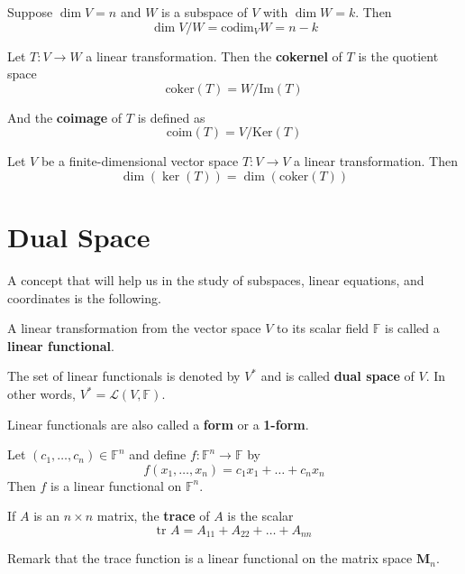 \begin{theorem}
	Suppose $\dim V = n$ and $W$ is a subspace of $V$ with $\dim W = k$. Then 
	\[
		\dim V/W = \text{codim}_V W = n-k
	\]
\end{theorem}

\begin{definition}
	Let $T : V \longrightarrow W$ a linear transformation. Then the \textbf{cokernel} of $T$ is the quotient space
	\[
		\text{coker} (T) = W / \text{Im}(T)
	\] 

	And the \textbf{coimage} of $T$ is defined as
	\[
		\text{coim} (T) = V / \text{Ker}(T)
	\]
\end{definition}

\begin{corollary}
	Let $V$ be a finite-dimensional vector space $T : V \longrightarrow V$ a linear transformation. Then 
	\[
		\dim (\ker (T)) = \dim (\text{coker} (T))
	\]
\end{corollary}

\section{Dual Space}

A concept that will help us in the study of subspaces, linear equations, and coordinates is the following.

\begin{definition}
	A linear transformation from the vector space $V$ to its scalar field $\mathbb{F}$ is called a \textbf{linear functional}.
	
	The set of linear functionals is denoted by $V^\ast$ and is called \textbf{dual space} of $V$. In other words, $V^\ast = \mathcal{L}(V, \mathbb{F})$.
\end{definition}

Linear functionals are also called a \textbf{form} or a \textbf{1-form}.

\begin{example}
	Let $(c_1, \ldots, c_n) \in \mathbb{F}^n$ and define $f : \mathbb{F}^n \longrightarrow \mathbb{F}$ by 
	\[
		f(x_1, \ldots, x_n) = c_1 x_1 + \ldots + c_n x_n
	\]
	Then $f$ is a linear functional on $\mathbb{F}^n$.
\end{example}

\begin{example}[Trace]
	If $A$ is an $n \times n$ matrix, the \textbf{trace} of $A$ is the scalar
	\[
		\text{tr } A = A_{11} + A_{22} + \ldots + A_{nn}
	\]
	
	Remark that the trace function is a linear functional on the matrix space $\textbf{M}_n$.
\end{example}

